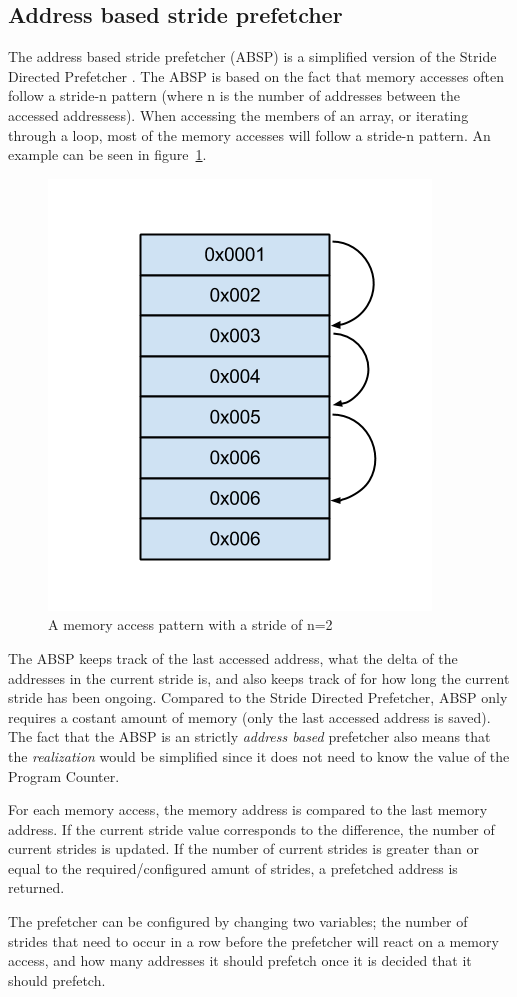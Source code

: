 \subsection{Address based stride prefetcher}
\label{sec:stridePrefetcher}
The address based stride prefetcher (ABSP) is a simplified version of
the Stride Directed Prefetcher \cite{stride}. The ABSP is based on the fact that
memory accesses often follow a stride-n pattern (where n is the number
of addresses between the accessed addressess). When accessing the
members of an array, or iterating through a loop, most of the memory
accesses will follow a stride-n pattern. An example can be seen in
figure~\ref{fig:stride}.

\begin{figure}[H]
\centerline{\includegraphics[scale=0.5]{./figures/stride}}
\caption{A memory access pattern with a stride of n=2}
\label{fig:stride}
\end{figure}

The ABSP keeps track of the last accessed address, what the delta of the addresses in the current stride is, and
also keeps track of for how long the current stride has been
ongoing. Compared to the Stride Directed Prefetcher, ABSP only requires a costant amount of memory (only the last accessed address is saved). The fact that the ABSP is an strictly \emph{address based} prefetcher also means that the \emph{realization} would be simplified since it does not need to know the value of the Program Counter.

For each memory access, the memory address is compared to the last
memory address. If the current stride value corresponds to the
difference, the number of current strides is updated. If the number of
current strides is greater than or equal to the required/configured
amunt of strides, a prefetched address is returned.  

The prefetcher can be configured by changing two variables;
the number of strides that need to occur in a row before
the prefetcher will react on a memory access, and how many addresses it should prefetch once it is decided that it should prefetch.

